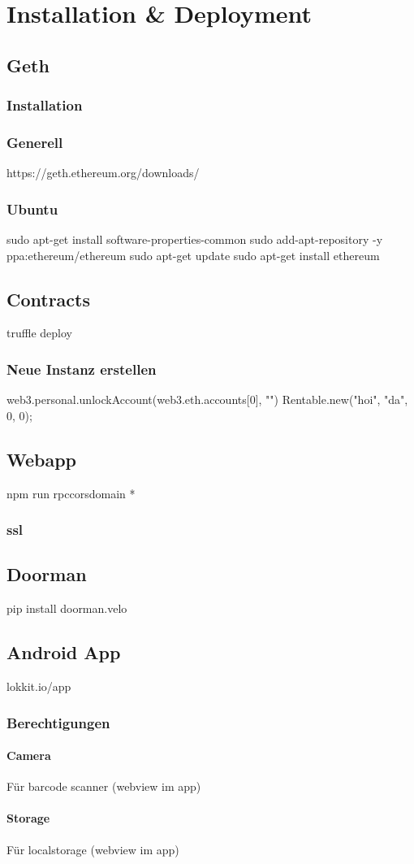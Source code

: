 \chapter{Installation \& Deployment}
\label{cha:Installation_Deployment}

\section{Geth}
\subsection{Installation}
\subsection{Generell}
https://geth.ethereum.org/downloads/

\subsection{Ubuntu}
sudo apt-get install software-properties-common
sudo add-apt-repository -y ppa:ethereum/ethereum
sudo apt-get update
sudo apt-get install ethereum

\section{Contracts}
truffle deploy
\subsection{Neue Instanz erstellen}
web3.personal.unlockAccount(web3.eth.accounts[0], "")
Rentable.new("hoi", "da", 0, 0);

\section{Webapp}
npm run rpccorsdomain *
\subsection{ssl}

\section{Doorman}
pip install doorman.velo

\section{Android App}
lokkit.io/app
\subsection{Berechtigungen}
\subsubsection{Camera}
Für barcode scanner (webview im app)
\subsubsection{Storage}
Für localstorage (webview im app)
